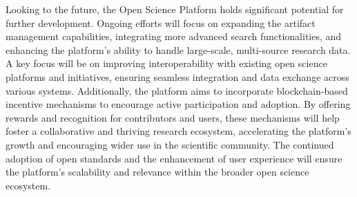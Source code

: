 \documentclass{article}
\begin{document}
Looking to the future, the Open Science Platform holds significant potential for further development. Ongoing efforts will focus on expanding the artifact management capabilities, integrating more advanced search functionalities, and enhancing the platform’s ability to handle large-scale, multi-source research data. A key focus will be on improving interoperability with existing open science platforms and initiatives, ensuring seamless integration and data exchange across various systems. Additionally, the platform aims to incorporate blockchain-based incentive mechanisms to encourage active participation and adoption. By offering rewards and recognition for contributors and users, these mechanisms will help foster a collaborative and thriving research ecosystem, accelerating the platform's growth and encouraging wider use in the scientific community. The continued adoption of open standards and the enhancement of user experience will ensure the platform’s scalability and relevance within the broader open science ecosystem.
\end{document}

